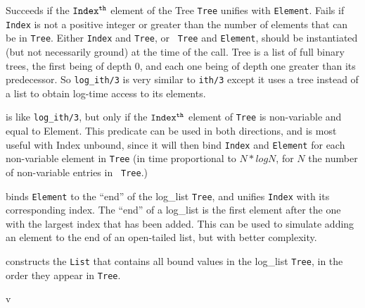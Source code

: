 \begin{description}

    Succeeds if the ${\tt Index^{th}}$ element of the Tree {\tt Tree}
    unifies with {\tt Element}.  Fails if {\tt Index} is not a
    positive integer or greater than the number of elements that can
    be in {\tt Tree}.  Either {\tt Index} and {\tt Tree}, or {\tt
    Tree} and {\tt Element}, should be instantiated (but not
    necessarily ground) at the time of the call.  Tree is a list of
    full binary trees, the first being of depth 0, and each one being
    of depth one greater than its predecessor.  So {\tt log\_ith/3} is
    very similar to {\tt ith/3} except it uses a tree instead of a
    list to obtain log-time access to its elements.

    is like {\tt log\_ith/3}, but only if the ${\tt Index^{th}}$ element
    of {\tt Tree} is non-variable and equal to Element.  This predicate
    can be used in both directions, and is most useful with Index
    unbound, since it will then bind {\tt Index} and {\tt Element} for
    each non-variable element in {\tt Tree} (in time proportional to
    $N*logN$, for $N$ the number of non-variable entries in {\tt
    Tree}.)

    binds {\tt Element} to the ``end'' of the log\_list {\tt Tree},
    and unifies {\tt Index} with its corresponding index.  The ``end''
    of a log\_list is the first element after the one with the largest
    index that has been added.  This can be used to simulate adding an
    element to the end of an open-tailed list, but with better
    complexity.

    constructs the {\tt List} that contains all bound values in the
    log\_list {\tt Tree}, in the order they appear in {\tt Tree}.
    
v%
%


   
\end{description}

